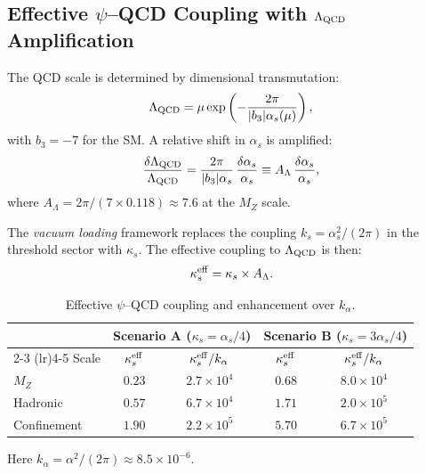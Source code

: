 \documentclass[11pt,letterpaper]{article}
\newcommand{\alphafine}{\alpha}
\newcommand{\kalpha}{k_\alpha}
\theoremstyle{definition}
\begin{document}
\subsection{Effective $\psi$--QCD Coupling with $\Lambda_{\rm QCD}$
Amplification}

The QCD scale is determined by dimensional transmutation:
\begin{equation}
\Lambda_{\rm QCD} = \mu \exp\left(-\frac{2\pi}{|b_3|\alpha_s(\mu)}\right),
\end{equation}
with $b_3 = -7$ for the SM.  A relative shift in $\alpha_s$ is
amplified:
\begin{equation}
\frac{\delta\Lambda_{\rm QCD}}{\Lambda_{\rm QCD}}
= \frac{2\pi}{|b_3|\alpha_s}\,\frac{\delta\alpha_s}{\alpha_s}
\equiv A_\Lambda \,\frac{\delta\alpha_s}{\alpha_s},
\end{equation}
where $A_\Lambda = 2\pi/(7 \times 0.118) \approx 7.6$ at the
$M_Z$ scale.

The \emph{vacuum loading} framework replaces the coupling
$k_s = \alpha_s^2/(2\pi)$ in the threshold sector with $\kappa_s$.
The effective coupling to $\Lambda_{\rm QCD}$ is then:
\begin{equation}\label{eq:effective-coupling}
\kappa_s^{\rm eff} = \kappa_s \times A_\Lambda.
\end{equation}

\begin{table}[h]
\centering
\caption{Effective $\psi$--QCD coupling and enhancement over
$\kalpha$.}\label{tab:effective}
\renewcommand{\arraystretch}{1.3}
\begin{tabular}{lcccc}
\toprule
& \multicolumn{2}{c}{Scenario A ($\kappa_s = \alpha_s/4$)}
& \multicolumn{2}{c}{Scenario B ($\kappa_s = 3\alpha_s/4$)} \\
\cmidrule(lr){2-3} \cmidrule(lr){4-5}
Scale & $\kappa_s^{\rm eff}$ & $\kappa_s^{\rm eff}/\kalpha$
& $\kappa_s^{\rm eff}$ & $\kappa_s^{\rm eff}/\kalpha$ \\
\midrule
$M_Z$ & $0.23$ & $2.7 \times 10^4$ & $0.68$ & $8.0 \times 10^4$ \\
Hadronic & $0.57$ & $6.7 \times 10^4$ & $1.71$ & $2.0 \times 10^5$ \\
Confinement & $1.90$ & $2.2 \times 10^5$ & $5.70$ & $6.7 \times 10^5$ \\
\bottomrule
\end{tabular}
\end{table}

Here $\kalpha = \alphafine^2/(2\pi) \approx 8.5 \times 10^{-6}$.
\end{document}
